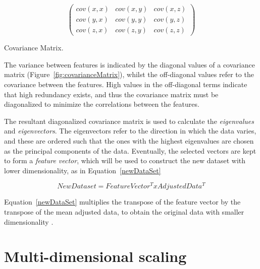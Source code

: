 \begin{marginfigure}
	\begin{equation*}
        \begin{pmatrix} cov(x, x) & cov(x, y) & cov(x, z) \\ cov(y, x) & cov(y, y) & cov(y, z) \\ cov(z, x) & cov(z, y) & cov(z, z)
        \end{pmatrix}
\end{equation*}
\caption{Covariance Matrix.}
\label{fig:covarianceMatrix}
\end{marginfigure}

The variance between features is indicated by the diagonal values of a covariance matrix (Figure~\ref{fig:covarianceMatrix}), whilst the off-diagonal values refer to the covariance between the features. High values in the off-diagonal terms indicate that high redundancy exists, and thus the covariance matrix must be diagonalized to minimize the correlations between the features. 

The resultant diagonalized covariance matrix is used to calculate the \textit{eigenvalues} and \textit{eigenvectors}. The eigenvectors refer to the direction in which the data varies, and these are ordered such that the ones with the highest eigenvalues are chosen as the principal components of the data. Eventually, the selected vectors are kept to form a \textit{feature vector}, which will be used to construct the new dataset with lower dimensionality, as in Equation~\ref{newDataSet} 


\begin{equation}\label{newDataSet}
	New Dataset = FeatureVector^T x AdjustedData^T 
	\end{equation}

Equation~\ref{newDataSet} multiplies the transpose of the feature vector by the transpose of the mean adjusted data, to obtain the original data with smaller dimensionality \citep{jackson2005user}.

\section{Multi-dimensional scaling}

